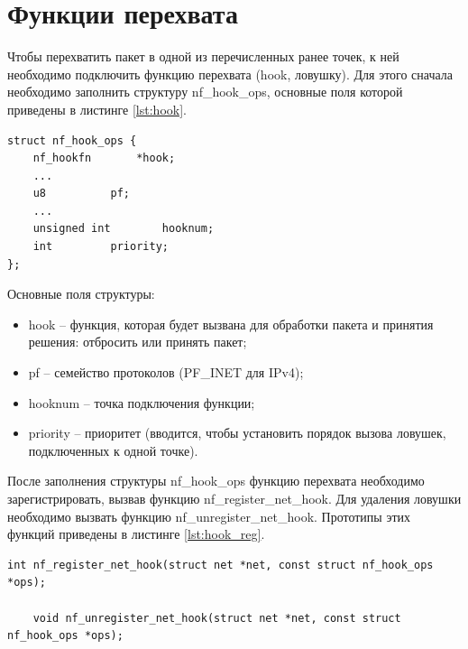

\section{Функции перехвата}
Чтобы перехватить пакет в одной из перечисленных ранее точек, к ней необходимо подключить функцию перехвата (hook, ловушку). Для этого сначала необходимо заполнить структуру nf\_hook\_ops, основные поля которой приведены в листинге \ref{lst:hook}.

\begin{lstlisting}[caption = {Структура struct nf\_hook\_ops}, label=lst:hook]
struct nf_hook_ops {
	nf_hookfn		*hook;
	...
	u8			pf;
	...
	unsigned int		hooknum;
	int			priority;
};
\end{lstlisting}


Основные поля структуры:
\begin{itemize}
	\item hook -- функция, которая будет вызвана для обработки пакета и принятия решения: отбросить или принять пакет;
	
	\item pf -- семейство протоколов (PF\_INET для IPv4);
	
	\item hooknum -- точка подключения функции;
	
	\item priority -- приоритет (вводится, чтобы установить порядок вызова ловушек, подключенных к одной точке).
\end{itemize}

После заполнения структуры nf\_hook\_ops функцию перехвата необходимо зарегистрировать, вызвав функцию nf\_register\_net\_hook. Для удаления ловушки необходимо вызвать функцию nf\_unregister\_net\_hook. Прототипы этих функций приведены в листинге \ref{lst:hook_reg}.

\begin{lstlisting}[caption = {Функции для регистрации и удаления функций перехвата}, label=lst:hook_reg]
	int nf_register_net_hook(struct net *net, const struct nf_hook_ops *ops);

	void nf_unregister_net_hook(struct net *net, const struct nf_hook_ops *ops);
\end{lstlisting}




